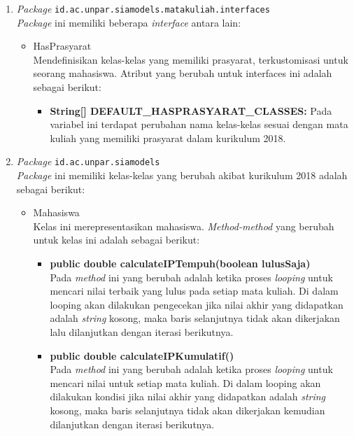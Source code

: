 \begin{enumerate}
	\item \textit{Package} \texttt{id.ac.unpar.siamodels.matakuliah.interfaces}\\
	\textit{Package} ini memiliki beberapa \textit{interface} antara lain:
	\begin{itemize}
		\item HasPrasyarat\\
		Mendefinisikan kelas-kelas yang memiliki prasyarat, terkustomisasi untuk seorang mahasiswa. Atribut yang berubah untuk interfaces ini adalah sebagai berikut:
		\begin{itemize}
			\item \textbf{String[] DEFAULT\_HASPRASYARAT\_CLASSES:} Pada variabel ini terdapat perubahan nama kelas-kelas sesuai dengan mata kuliah yang memiliki prasyarat dalam kurikulum 2018.
		\end{itemize}
	\end{itemize}
	
	\item \textit{Package} \texttt{id.ac.unpar.siamodels}\\
	\textit{Package} ini memiliki kelas-kelas yang berubah akibat kurikulum 2018 adalah sebagai berikut:
	\begin{itemize}
			\item Mahasiswa\\
				Kelas ini merepresentasikan mahasiswa. \textit{Method-method} yang berubah untuk kelas ini adalah sebagai berikut:
				\begin{itemize}
					\item \textbf{public double calculateIPTempuh(boolean lulusSaja)}\\
						Pada \textit{method} ini yang berubah adalah ketika proses \textit{looping} untuk mencari nilai terbaik yang lulus pada setiap mata kuliah. Di dalam looping akan dilakukan pengecekan jika nilai akhir yang didapatkan adalah \textit{string} kosong, maka baris selanjutnya tidak akan dikerjakan lalu dilanjutkan dengan iterasi berikutnya.
					
					\item \textbf{public double calculateIPKumulatif()}\\
						Pada \textit{method} ini yang berubah adalah ketika proses \textit{looping} untuk mencari nilai untuk setiap mata kuliah. Di dalam looping akan dilakukan kondisi jika nilai akhir yang didapatkan adalah \textit{string} kosong, maka baris selanjutnya tidak akan dikerjakan kemudian dilanjutkan dengan iterasi berikutnya.
					

\end{itemize}
\end{itemize}
\end{enumerate}
